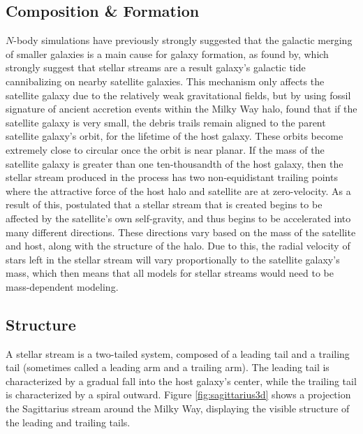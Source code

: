 \documentclass[twocolumn]{article}
\begin{document}
\subsection{Composition \& Formation} 
$N$-body simulations have previously strongly suggested that the galactic merging of smaller galaxies is a main cause for galaxy formation, as found by\cite{galaxyNBody}, which strongly suggest that stellar streams are a result galaxy's galactic tide cannibalizing on nearby satellite galaxies. This mechanism only affects the satellite galaxy due to the relatively weak gravitational fields, but by using fossil signature of ancient accretion events within the Milky Way halo, \cite{accretionEvents} found that if the satellite galaxy is very small, the debris trails remain aligned to the parent satellite galaxy's orbit, for the lifetime of the host galaxy. These orbits become extremely close to circular once the orbit is near planar. If the mass of the satellite galaxy is greater than one ten-thousandth of the host galaxy, then the stellar stream produced in the process has two non-equidistant trailing points where the attractive force of the host halo and satellite are at zero-velocity. As a result of this, \cite{dynamicsOfTidalTails} postulated that a stellar stream that is created begins to be affected by the satellite's own self-gravity, and thus begins to be accelerated into many different directions. These directions vary based on the mass of the satellite and host, along with the structure of the halo. Due to this, the radial velocity of stars left in the stellar stream will vary proportionally to the satellite galaxy's mass, which then means that all models for stellar streams would need to be mass-dependent modeling. 

\subsection{Structure}
A stellar stream is a two-tailed system, composed of a leading tail and a trailing tail (sometimes called a leading arm and a trailing arm). The leading tail is characterized by a gradual fall into the host galaxy's center, while the trailing tail is characterized by a spiral outward. Figure \ref{fig:sagittarius3d} shows a projection the Sagittarius stream around the Milky Way, displaying the visible structure of the leading and trailing tails. 
\end{document}
